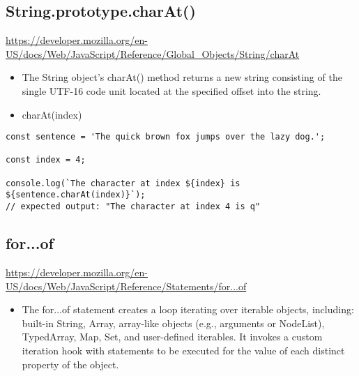 \documentclass[10pt]{article}
\begin{document}
\medskip %








\medskip %
\pagebreak
\subsection{String.prototype.charAt()}

\url{https://developer.mozilla.org/en-US/docs/Web/JavaScript/Reference/Global_Objects/String/charAt}

\begin{itemize}
	\item The String object's charAt() method returns a new string consisting of the single UTF-16 code unit located at the specified offset into the string.
	\item charAt(index)
\end{itemize}

\begin{lstlisting}[title=Example charAt(), captionpos=t]
const sentence = 'The quick brown fox jumps over the lazy dog.';

const index = 4;

console.log(`The character at index ${index} is ${sentence.charAt(index)}`);
// expected output: "The character at index 4 is q"
\end{lstlisting}

\medskip %








\medskip %
\pagebreak
\subsection{for...of}

\url{https://developer.mozilla.org/en-US/docs/Web/JavaScript/Reference/Statements/for...of}

\begin{itemize}
	\item The for...of statement creates a loop iterating over iterable objects, including: built-in String, Array, array-like objects (e.g., arguments or NodeList), TypedArray, Map, Set, and user-defined iterables. It invokes a custom iteration hook with statements to be executed for the value of each distinct property of the object.
\end{itemize}
\end{document}
